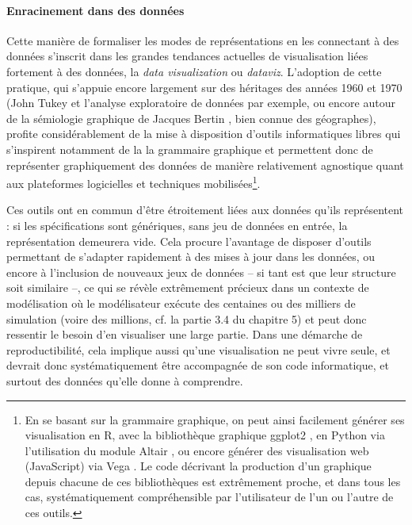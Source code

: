 \documentclass[a4paper, 12pt]{article}
\begin{document}
\paragraph{Enracinement dans des données}

Cette manière de formaliser les modes de représentations en les \og connectant\fg{} à des données s'inscrit dans les grandes tendances actuelles de visualisation liées fortement à des données, la \og \textit{data visualization}\fg{} ou \og \textit{dataviz}\fg{}.
L'adoption de cette pratique, qui s'appuie encore largement sur des héritages des années 1960 et 1970 (John Tukey et l'analyse exploratoire de données \autocite{tukey_exploratory_1977} par exemple, ou encore autour de la sémiologie graphique de Jacques Bertin \autocite{bertin1973semiologie}, bien connue des géographes), profite considérablement de la mise à disposition d'outils informatiques libres qui s'inspirent notamment de la la grammaire graphique et permettent donc de représenter graphiquement des données de manière relativement agnostique quant aux plateformes logicielles et techniques mobilisées\footnote{
En se basant sur la grammaire graphique, on peut ainsi facilement générer ses visualisation en R, avec la bibliothèque graphique \textsf{ggplot2} \autocite{wickham_ggplot2_2016}, en Python via l'utilisation du module \textsf{Altair} \autocite{Altair2018}, ou encore générer des visualisation web (JavaScript) via \textsf{Vega} \autocite{satyanarayan_reactive_2016}.
Le code décrivant la production d'un graphique depuis chacune de ces bibliothèques est extrêmement proche, et dans tous les cas, systématiquement compréhensible par l'utilisateur de l'un ou l'autre de ces outils.
}.


Ces outils ont en commun d'être étroitement liées aux données qu'ils représentent : si les spécifications sont génériques, sans jeu de données en entrée, la représentation demeurera vide.
Cela procure l'avantage de disposer d'outils permettant de s'adapter rapidement à des mises à jour dans les données, ou encore à l'inclusion de nouveaux jeux de données -- si tant est que leur structure soit similaire --, ce qui se révèle extrêmement précieux dans un contexte de modélisation où le modélisateur exécute des centaines ou des milliers de simulation (voire des millions, cf. la partie 3.4 du chapitre 5) et peut donc ressentir le besoin d'en visualiser une large partie.
Dans une démarche de reproductibilité, cela implique aussi qu'une visualisation ne peut vivre seule, et devrait donc systématiquement être accompagnée de son code informatique, et surtout des données qu'elle donne à comprendre.
\end{document}
